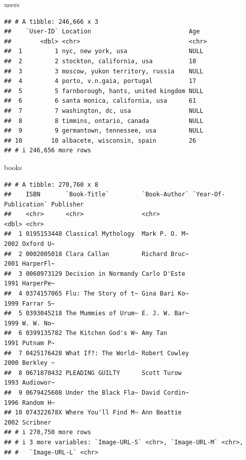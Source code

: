 \documentclass[
]{book}
\newenvironment{Shaded}{\begin{snugshade}}{\end{snugshade}}
\newcommand{\NormalTok}[1]{#1}
\theoremstyle{definition}
\theoremstyle{definition}
\theoremstyle{definition}
\theoremstyle{definition}
\theoremstyle{remark}
\begin{document}
\begin{Shaded}
\begin{Highlighting}[]
\NormalTok{users}
\end{Highlighting}
\end{Shaded}

\begin{verbatim}
## # A tibble: 246,666 x 3
##    `User-ID` Location                           Age  
##        <dbl> <chr>                              <chr>
##  1         1 nyc, new york, usa                 NULL 
##  2         2 stockton, california, usa          18   
##  3         3 moscow, yukon territory, russia    NULL 
##  4         4 porto, v.n.gaia, portugal          17   
##  5         5 farnborough, hants, united kingdom NULL 
##  6         6 santa monica, california, usa      61   
##  7         7 washington, dc, usa                NULL 
##  8         8 timmins, ontario, canada           NULL 
##  9         9 germantown, tennessee, usa         NULL 
## 10        10 albacete, wisconsin, spain         26   
## # i 246,656 more rows
\end{verbatim}

\begin{Shaded}
\begin{Highlighting}[]
\NormalTok{books}
\end{Highlighting}
\end{Shaded}

\begin{verbatim}
## # A tibble: 270,760 x 8
##    ISBN       `Book-Title`         `Book-Author` `Year-Of-Publication` Publisher
##    <chr>      <chr>                <chr>                         <dbl> <chr>    
##  1 0195153448 Classical Mythology  Mark P. O. M~                  2002 Oxford U~
##  2 0002005018 Clara Callan         Richard Bruc~                  2001 HarperFl~
##  3 0060973129 Decision in Normandy Carlo D'Este                   1991 HarperPe~
##  4 0374157065 Flu: The Story of t~ Gina Bari Ko~                  1999 Farrar S~
##  5 0393045218 The Mummies of Urum~ E. J. W. Bar~                  1999 W. W. No~
##  6 0399135782 The Kitchen God's W~ Amy Tan                        1991 Putnam P~
##  7 0425176428 What If?: The World~ Robert Cowley                  2000 Berkley ~
##  8 0671870432 PLEADING GUILTY      Scott Turow                    1993 Audiowor~
##  9 0679425608 Under the Black Fla~ David Cordin~                  1996 Random H~
## 10 074322678X Where You'll Find M~ Ann Beattie                    2002 Scribner 
## # i 270,750 more rows
## # i 3 more variables: `Image-URL-S` <chr>, `Image-URL-M` <chr>,
## #   `Image-URL-L` <chr>
\end{verbatim}
\end{document}
